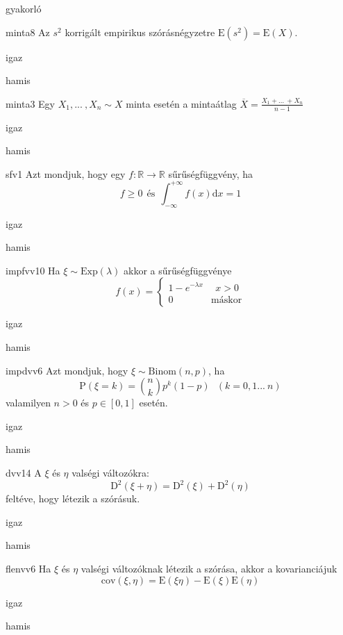 \documentclass[12pt]{article}
\begin{document}
\begin{quiz}{gyakorló}
\begin{multi}[feedback={Az $s^2$ torzítatlan becslése a sokasági (elméleti) szórásnégyzetnek}]{minta8}
Az $s^2$ korrigált empirikus szórásnégyzetre $\mathrm{E}(s^2)=\mathrm{E}(X)$.
\item igaz
\item* hamis
\end{multi}
\begin{multi}[feedback={Definíció}]{minta3}
Egy $X_1,{...\:},X_n\sim X$ minta esetén a mintaátlag $\overline{X}=\frac{X_1+{...\:}+X_n}{n-1}$
\item igaz
\item* hamis
\end{multi}
\begin{multi}[feedback={Def.}]{sfv1}
Azt mondjuk, hogy egy $f:\mathbb{R}\to \mathbb{R}$ sűrűségfüggvény, ha 
$$
f\ge 0 \ \ \text{és}\ \ \int_{-\infty}^{+\infty}f(x)\mathrm{d } x=1
$$
\item* igaz
\item hamis
\end{multi}
\begin{multi}[feedback={Def.}]{impfvv10}
Ha $\xi\sim \mathrm{Exp}(\lambda)$ akkor a sűrűségfüggvénye 
$$
f(x)=
\begin{cases}
1-e^{-\lambda x}& \ \ x>0\\
0 & \text{máskor} 
\end{cases}
$$
\item igaz
\item* hamis
\end{multi}
\begin{multi}[feedback={Def.}]{impdvv6}
Azt mondjuk, hogy $\xi\sim \mathrm{Binom}(n,p)$, ha 
$$
\mathrm{P}(\xi=k)=\binom{n}{k}p^k(1-p)\ \ \ (k=0,1{...\:} n)
$$
valamilyen $n>0$ és $p\in[0,1]$ esetén.
\item igaz
\item* hamis
\end{multi}
\begin{multi}[feedback={Páronként független valségi változókra a szórásnégyzet additív, általában nem.}]{dvv14}
A $\xi$ és $\eta$ valségi változókra:
$$
\mathrm{D}^2(\xi+\eta)=\mathrm{D}^2(\xi)+\mathrm{D}^2(\eta)
$$
feltéve, hogy létezik a szórásuk.
\item igaz
\item* hamis
\end{multi}
\begin{multi}[feedback={Tulajdonság.}]{flenvv6}
Ha $\xi$ és $\eta$ valségi változóknak létezik a szórása, akkor a 
kovarianciájuk
$$
\mathrm{cov}(\xi,\eta)=\mathrm{E}(\xi\eta)-\mathrm{E}(\xi)\mathrm{E}(\eta)
$$
\item* igaz
\item hamis

\end{multi}
\end{quiz}
\end{document}
